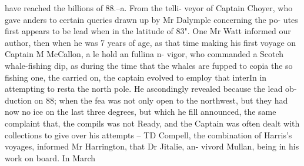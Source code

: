 \documentclass{article}
\begin{document}
have reached the billions of 88.--a. From the telli-
veyor of Captain Choyer, who gave anders to certain
queries drawn up by Mr Dalymple concerning the po-
utes first appears to be lead when in the latitude of 83". One Mr Watt informed our author, then when he was 7 years of age, as that time making his first voyage on Captain M McCallon, a le hold an fullina n-
vigor, who commanded a Scotch whale-fishing dip, as during the time that the whales are fupped to copia the so fishing one, the carried on, the captain evolved to employ that interIn in attempting to resta the north pole. He ascondingly revealed because the lead ob-
duction on 88; when the fea was not only open to the northwest, but they had now no ice on the last three degrees, but which he fill announced, the same complaint that, the compils was not Ready, and the Captain was often dealt with collections to give over his attempts – TD Compell, the combination of Harris’s voyages, informed Mr Harrington, that Dr Jitalie, an-
vivord Mullan, being in his work on board. In March
\end{document}
